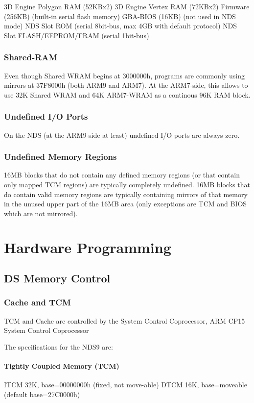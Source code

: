 \documentclass[11pt,a4paper]{proc}
\begin{document}
\begin{flushleft}
  3D Engine Polygon RAM (52KBx2)
  3D Engine Vertex RAM (72KBx2)
  Firmware (256KB) (built-in serial flash memory)
  GBA-BIOS (16KB) (not used in NDS mode)
  NDS Slot ROM (serial 8bit-bus, max 4GB with default protocol)
  NDS Slot FLASH/EEPROM/FRAM (serial 1bit-bus)


\subsubsection{Shared-RAM}
Even though Shared WRAM begins at 3000000h, programs are commonly using mirrors at 37F8000h (both ARM9 and ARM7). At the ARM7-side, this allows to use 32K Shared WRAM and 64K ARM7-WRAM as a continous 96K RAM block.

\subsubsection{Undefined I/O Ports}
On the NDS (at the ARM9-side at least) undefined I/O ports are always zero.

\subsubsection{Undefined Memory Regions}
16MB blocks that do not contain any defined memory regions (or that contain only mapped TCM regions) are typically completely undefined.
16MB blocks that do contain valid memory regions are typically containing mirrors of that memory in the unused upper part of the 16MB area (only exceptions are TCM and BIOS which are not mirrored).

\section{Hardware Programming}
\subsection{DS Memory Control}
\subsubsection{Cache and TCM}
TCM and Cache are controlled by the System Control Coprocessor,
ARM CP15 System Control Coprocessor

The specifications for the NDS9 are:

\paragraph{Tightly Coupled Memory (TCM)}
  ITCM 32K, base=00000000h (fixed, not move-able)
  DTCM 16K, base=moveable  (default base=27C0000h)


\end{flushleft}
\end{document}
